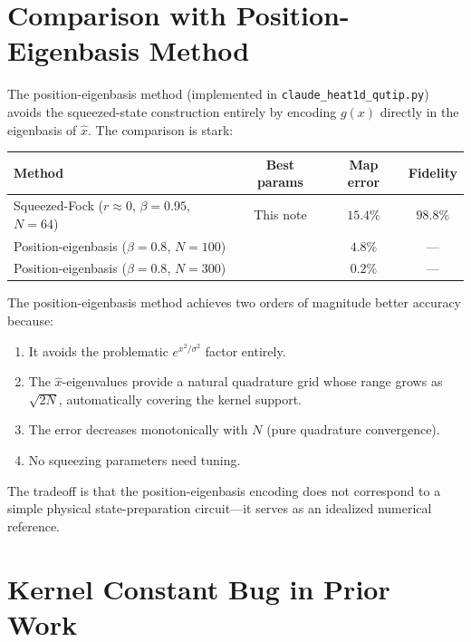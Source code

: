 \documentclass[11pt]{article}
\begin{document}
\section{Comparison with Position-Eigenbasis Method}

The position-eigenbasis method (implemented in \texttt{claude\_heat1d\_qutip.py})
avoids the squeezed-state construction entirely by encoding $g(x)$ directly
in the eigenbasis of $\hat{x}$.  The comparison is stark:

\begin{center}
\begin{tabular}{lccc}
  \toprule
  Method & Best params & Map error & Fidelity \\
  \midrule
  Squeezed-Fock ($r \approx 0$, $\beta = 0.95$, $N=64$)
    & This note & $15.4\%$ & $98.8\%$ \\
  Position-eigenbasis ($\beta = 0.8$, $N = 100$)
    & \cite{claude_xbasis} & $4.8\%$ & --- \\
  Position-eigenbasis ($\beta = 0.8$, $N = 300$)
    & \cite{claude_xbasis} & $0.2\%$ & --- \\
  \bottomrule
\end{tabular}
\end{center}

The position-eigenbasis method achieves two orders of magnitude better
accuracy because:
\begin{enumerate}[itemsep=3pt]
  \item It avoids the problematic $e^{x^2/\sigma^2}$ factor entirely.
  \item The $\hat{x}$-eigenvalues provide a natural quadrature grid whose
        range grows as $\sqrt{2N}$, automatically covering the kernel support.
  \item The error decreases monotonically with $N$ (pure quadrature convergence).
  \item No squeezing parameters need tuning.
\end{enumerate}

The tradeoff is that the position-eigenbasis encoding does not correspond
to a simple physical state-preparation circuit---it serves as an idealized
numerical reference.

\section{Kernel Constant Bug in Prior Work}\label{sec:kernel-bug}
\end{document}
